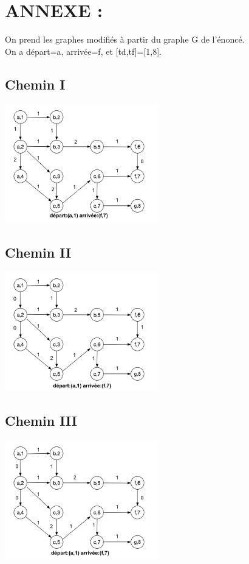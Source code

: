 \documentclass{article}
\begin{document}
\newpage
\section*{ANNEXE :}

On prend les graphes modifiés à partir du graphe G de l'énoncé.\\
On a départ=a, arrivée=f, et [td,tf]=[1,8].
\begin{center}
\subsection*{Chemin I}
\centering
\includegraphics[width=0.5\textwidth]{chemin_I.png}
\subsection*{Chemin II}
\centering
\includegraphics[width=0.5\textwidth]{chemin_II.png}
\subsection*{Chemin III}
\centering
\includegraphics[width=0.5\textwidth]{chemin_III.png}

\end{center}
\end{document}
